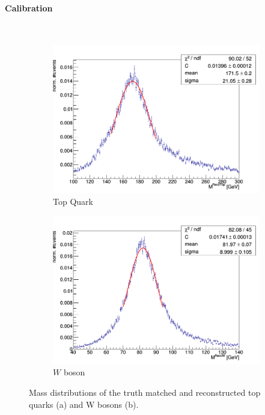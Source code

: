\paragraph{Calibration} \mbox{} \\

\begin{figure}[H]
\begin{subfigure}{.5\textwidth}
  \centering
  \includegraphics[width=.99\linewidth]{figs/HadTop/TopMass}
  \caption{Top Quark}
  \label{fig:Calt}
\end{subfigure}%
\begin{subfigure}{.5\textwidth}
  \centering
  \includegraphics[width=.99\linewidth]{figs/HadTop/WMass}
  \caption{$W$ boson}
  \label{fig:CalW}
\end{subfigure}
\caption{Mass distributions of the truth matched and reconstructed top quarks (a) and W bosons (b).}
\label{fig:Cal}
\end{figure}

